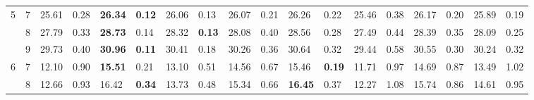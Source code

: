 \documentclass[conference]{IEEEtran}
\begin{document}
\begin{table}[t]
\begin{tabular}{|cc|ll|ll|ll|ll|ll|ll|ll|ll|}
		\multicolumn{1}{|c|}{\multirow{3}{*}{5}}  & 7          & \multicolumn{1}{l|}{25.61}         & 0.28                              & \multicolumn{1}{l|}{\textbf{26.34}} & \textbf{0.12}                     & \multicolumn{1}{l|}{26.06}         & 0.13                              & \multicolumn{1}{l|}{26.07}         & 0.21                              & \multicolumn{1}{l|}{26.26}                & 0.22          & \multicolumn{1}{l|}{25.46} & 0.38 & \multicolumn{1}{l|}{26.17}          & 0.20          & \multicolumn{1}{l|}{25.89} & 0.19 \\ \cline{2-18} 
		\multicolumn{1}{|c|}{}                    & 8          & \multicolumn{1}{l|}{27.79}         & 0.33                              & \multicolumn{1}{l|}{\textbf{28.73}} & 0.14                              & \multicolumn{1}{l|}{28.32}         & \textbf{0.13}                     & \multicolumn{1}{l|}{28.08}         & 0.40                              & \multicolumn{1}{l|}{28.56}                & 0.28          & \multicolumn{1}{l|}{27.49} & 0.44 & \multicolumn{1}{l|}{28.39}          & 0.35          & \multicolumn{1}{l|}{28.09} & 0.25 \\ \cline{2-18} 
		\multicolumn{1}{|c|}{}                    & 9          & \multicolumn{1}{l|}{29.73}         & 0.40                              & \multicolumn{1}{l|}{\textbf{30.96}} & \textbf{0.11}                     & \multicolumn{1}{l|}{30.41}         & 0.18                              & \multicolumn{1}{l|}{30.26}         & 0.36                              & \multicolumn{1}{l|}{30.64}                & 0.32          & \multicolumn{1}{l|}{29.44} & 0.58 & \multicolumn{1}{l|}{30.55}          & 0.30          & \multicolumn{1}{l|}{30.24} & 0.32 \\ \hline
		\multicolumn{1}{|c|}{\multirow{3}{*}{6}}  & 7          & \multicolumn{1}{l|}{12.10}         & 0.90                              & \multicolumn{1}{l|}{\textbf{15.51}} & 0.21                              & \multicolumn{1}{l|}{13.10}         & 0.51                              & \multicolumn{1}{l|}{14.56}         & 0.67                              & \multicolumn{1}{l|}{15.46}                & \textbf{0.19} & \multicolumn{1}{l|}{11.71} & 0.97 & \multicolumn{1}{l|}{14.69}          & 0.87          & \multicolumn{1}{l|}{13.49} & 1.02 \\ \cline{2-18} 
		\multicolumn{1}{|c|}{}                    & 8          & \multicolumn{1}{l|}{12.66}         & 0.93                              & \multicolumn{1}{l|}{16.42}          & \textbf{0.34}                     & \multicolumn{1}{l|}{13.73}         & 0.48                              & \multicolumn{1}{l|}{15.34}         & 0.66                              & \multicolumn{1}{l|}{\textbf{16.45}}       & 0.37          & \multicolumn{1}{l|}{12.27} & 1.08 & \multicolumn{1}{l|}{15.74}          & 0.86          & \multicolumn{1}{l|}{14.61} & 0.95 \\ \cline{2-18} 

\end{tabular}
\end{table}
\end{document}
